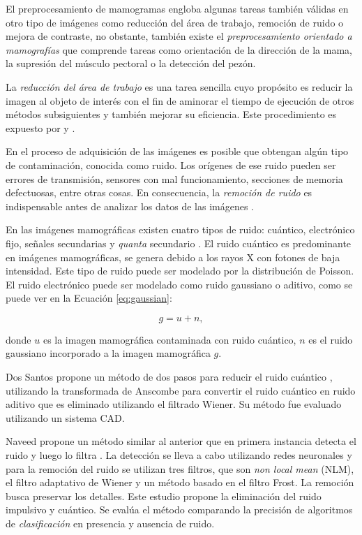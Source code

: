 El preprocesamiento de mamogramas engloba algunas tareas también válidas en
otro tipo de imágenes como reducción del área de trabajo, remoción de ruido o
mejora de contraste, no obstante, también existe el \textit{preprocesamiento
orientado a mamografías} que comprende tareas como orientación de la dirección
de la mama, la supresión del músculo pectoral o la detección del pezón.

La \textit{reducción del área de trabajo} es una tarea sencilla cuyo propósito
es reducir la imagen al objeto de interés con el fin de aminorar el tiempo de
ejecución de otros métodos subsiguientes y también mejorar su eficiencia. Este
procedimiento es expuesto por \cite{holguinpre} y \cite{dehghani2011method}.

En el proceso de adquisición de las imágenes es posible que obtengan algún tipo
de contaminación, conocida como ruido. Los orígenes de ese ruido pueden ser
errores de transmisión, sensores con mal funcionamiento, secciones de memoria
defectuosas, entre otras cosas. En consecuencia, la \textit{remoción de ruido}
es indispensable antes de analizar los datos de las imágenes
\cite{motwani2004survey}.

En las imágenes mamográficas existen cuatro tipos de ruido: cuántico,
electrónico fijo, señales secundarias y \textit{quanta} secundario
\cite{hashimoto2008practical}. El ruido cuántico es predominante en imágenes
mamográficas, se genera debido a los rayos X con fotones de baja intensidad.
Este tipo de ruido puede ser modelado por la distribución de Poisson. El ruido
electrónico puede ser modelado como ruido gaussiano o aditivo, como se puede
ver en la Ecuación \ref{eq:gaussian}:

\begin{equation}
\label{eq:gaussian}
            g = u + n,
\end{equation}

\noindent donde $u$ es la imagen mamográfica contaminada con ruido cuántico,
$n$ es el ruido gaussiano incorporado a la imagen mamográfica $g$.

Dos Santos propone un método de dos pasos para reducir el ruido cuántico
\cite{dos2009pre, dos2009mammography}, utilizando la transformada de Anscombe
para convertir el ruido cuántico en ruido aditivo que es eliminado utilizando
el filtrado Wiener. Su método fue evaluado utilizando un sistema CAD. 

Naveed propone un método similar al anterior que en primera instancia detecta
el ruido y luego lo filtra \cite{naveed2012quantum}. La detección se lleva a
cabo utilizando redes neuronales y para la remoción del ruido se utilizan tres
filtros, que son \textit{non local mean} (NLM), el filtro adaptativo de Wiener
y un método basado en el filtro Frost. La remoción busca preservar los
detalles. Este estudio propone la eliminación del ruido impulsivo y cuántico.
Se evalúa el método comparando la precisión de algoritmos de
\textit{clasificación} en presencia y ausencia de ruido.

